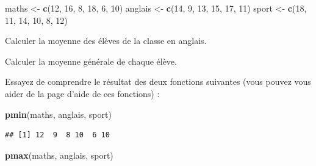 \documentclass[12pt,]{book}
\newenvironment{Shaded}{\begin{snugshade}}{\end{snugshade}}
\newcommand{\DecValTok}[1]{\textcolor[rgb]{0.06,0.06,0.06}{#1}}
\newcommand{\KeywordTok}[1]{\textcolor[rgb]{0.27,0.27,0.27}{\textbf{#1}}}
\newcommand{\NormalTok}[1]{#1}
\newcommand{\OperatorTok}[1]{\textcolor[rgb]{0.43,0.43,0.43}{\textbf{#1}}}
\newcommand{\StringTok}[1]{\textcolor[rgb]{0.5,0.5,0.5}{#1}}
\begin{document}
\begin{Shaded}
\begin{Highlighting}[]
\NormalTok{maths <-}\StringTok{ }\KeywordTok{c}\NormalTok{(}\DecValTok{12}\NormalTok{, }\DecValTok{16}\NormalTok{, }\DecValTok{8}\NormalTok{, }\DecValTok{18}\NormalTok{, }\DecValTok{6}\NormalTok{, }\DecValTok{10}\NormalTok{)}
\NormalTok{anglais <-}\StringTok{ }\KeywordTok{c}\NormalTok{(}\DecValTok{14}\NormalTok{, }\DecValTok{9}\NormalTok{, }\DecValTok{13}\NormalTok{, }\DecValTok{15}\NormalTok{, }\DecValTok{17}\NormalTok{, }\DecValTok{11}\NormalTok{)}
\NormalTok{sport <-}\StringTok{ }\KeywordTok{c}\NormalTok{(}\DecValTok{18}\NormalTok{, }\DecValTok{11}\NormalTok{, }\DecValTok{14}\NormalTok{, }\DecValTok{10}\NormalTok{, }\DecValTok{8}\NormalTok{, }\DecValTok{12}\NormalTok{)}
\end{Highlighting}
\end{Shaded}

Calculer la moyenne des élèves de la classe en anglais.

Calculer la moyenne générale de chaque élève.

Essayez de comprendre le résultat des deux fonctions suivantes (vous pouvez vous aider de la page d'aide de ces fonctions) :

\begin{Shaded}
\begin{Highlighting}[]
\KeywordTok{pmin}\NormalTok{(maths, anglais, sport)}
\end{Highlighting}
\end{Shaded}

\begin{verbatim}
## [1] 12  9  8 10  6 10
\end{verbatim}

\begin{Shaded}
\begin{Highlighting}[]
\KeywordTok{pmax}\NormalTok{(maths, anglais, sport)}
\end{Highlighting}
\end{Shaded}
\end{document}
